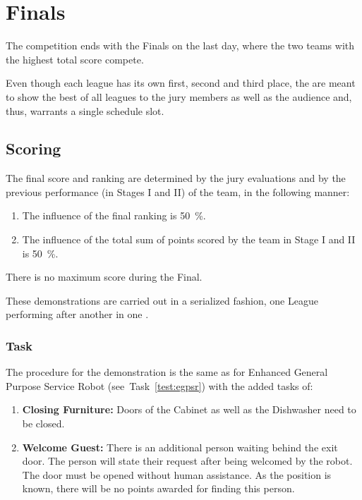\chapter{Finals}

The competition ends with the Finals on the last day, where the two teams with the highest total score compete.

Even though each league has its own first, second and third place, the  are meant to show the best of all leagues to the jury members as well as the audience and, thus, warrants a single schedule slot.

\section{Scoring}
The final score and ranking are determined by the jury evaluations and by the previous performance (in Stages I and II) of the team, in the following manner:

\begin{enumerate}
  \item The influence of the final ranking is \SI{50}{\percent}.
  \item The influence of the total sum of points scored by the team in Stage I and II is \SI{50}{\percent}.
\end{enumerate}

There is no maximum score during the Final.

These demonstrations are carried out in a serialized fashion, one League performing after another in one \Arena{}.

\subsection{Task}
The procedure for the demonstration is the same as for Enhanced General Purpose Service Robot (see~Task~\ref{test:egpsr}) with the added tasks of:

\begin{enumerate}[nosep]
\item \textbf{Closing Furniture:} Doors of the Cabinet as well as the Dishwasher need to be closed.
\item \textbf{Welcome Guest:} There is an additional person waiting behind the exit door. The person will state their request after being welcomed by the robot. The door must be opened without human assistance. As the position is known, there will be no points awarded for finding this person.
\end{enumerate}

